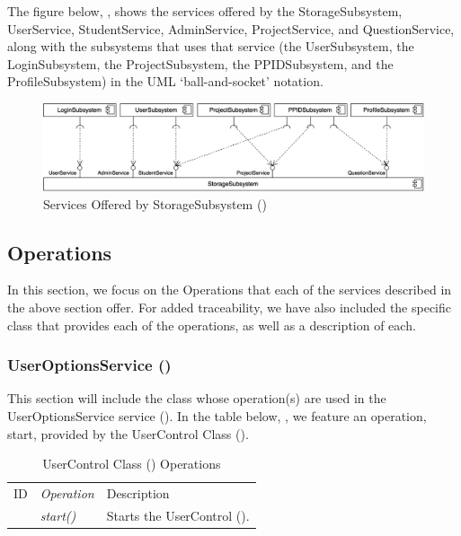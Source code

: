 \documentclass[12pt,letterpaper]{article}
\begin{document}
The figure below, , shows the services offered by the StorageSubsystem, UserService, StudentService, AdminService, ProjectService, and QuestionService, along with the subsystems that uses that service (the UserSubsystem, the LoginSubsystem, the ProjectSubsystem, the PPIDSubsystem, and the ProfileSubsystem) in the UML `ball-and-socket' notation.

\begin{figure}[H]
	\centering{}
	\includegraphics[scale=0.27]{imgs/d3/services/storage-subsystem.png}
	\caption{Services Offered by StorageSubsystem ()}
\end{figure}

\subsection{Operations}

In this section, we focus on the Operations that each of the services described in the above section offer. For added traceability, we have also included the specific class that provides each of the operations, as well as a description of each.

\subsubsection{UserOptionsService ()}

This section will include the class whose operation(s) are used in the UserOptionsService service (). In the table below, , we feature an operation, start, provided by the UserControl Class ().

\begin{table}[H]
	\caption{UserControl Class () Operations} 
	\begin{tabu} to 
		\tableheader{}ID & Operation & Description \\
         & start() & Starts the UserControl (). \\
	\end{tabu}
\end{table}
\end{document}
